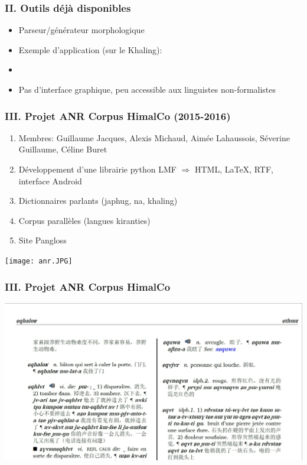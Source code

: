 \documentclass[xcolor=table]{beamer}
\begin{document}
 \begin{frame} 
 \frametitle{II. Outils déjà disponibles}
     
 \begin{itemize}
 \item Parseur/générateur morphologique 
 \item Exemple d'application (sur le Khaling):
 \item {}
 \item Pas d'interface graphique, peu accessible aux linguistes non-formalistes
  \end{itemize} 
\end{frame}

  
 \begin{frame} 
 \frametitle{III. Projet ANR Corpus HimalCo (2015-2016)}
 \begin{enumerate}%
 \item Membres: Guillaume Jacques, Alexis Michaud, Aimée Lahaussois, Séverine 
 Guillaume, Céline Buret
\item Développement d'une librairie python LMF $\Rightarrow$ HTML, \LaTeX, RTF, interface Android
\item Dictionnaires parlants (japhug, na, khaling)
\item Corpus parallèles (langues kiranties)
\item Site Pangloss
 \end{enumerate}
 
  \texttt{[image: anr.JPG]} \centering
  \end{frame}   
  
 \begin{frame} 
 \frametitle{III. Projet ANR Corpus HimalCo}  
   \includegraphics[width=\textwidth]{dico.jpg} \centering
  \end{frame}   
  
\end{document}
